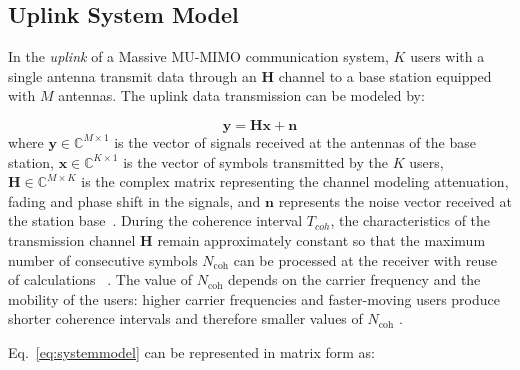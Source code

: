 \documentclass[12pt]{article}
\begin{document}
\subsection{Uplink System Model}
\label{sec:sysmodel}

In the \textit{uplink} of a Massive MU-MIMO communication system, $K$ users
with a single antenna transmit data through an $\mathbf{H}$ channel to
a base station equipped with $M$ antennas. The uplink data transmission
can be modeled by:

\begin{equation}
\mathbf{y} = \mathbf{H}\mathbf{x} + \mathbf{n}
\label{eq:systemmodel}
\end{equation}
where $\mathbf{y} \in \mathbb{C}^{M\times1}$ is the vector of signals received at the
antennas of the base station, $\mathbf{x} \in \mathbb{C}^{K\times1}$ is the vector of
symbols transmitted by the $K$ users, $\mathbf{H} \in \mathbb{C}^{M\times K}$
is the complex matrix representing the channel modeling attenuation, fading
and phase shift in the signals, and $\mathbf{n}$ represents the noise vector
received at the station base~\cite{rodriguezsanchez2020}. During the coherence interval $T_{coh}$, the characteristics of the
transmission channel $\mathbf{H}$ remain approximately constant so that the maximum number of
consecutive symbols $N_\text{coh}$ can be processed at the receiver with reuse
of calculations ~\cite{zhao2025jsac}. The value of $N_\text{coh}$ depends on the
carrier frequency and the mobility of the users: higher carrier frequencies
and faster-moving users produce shorter coherence intervals and therefore
smaller values of $N_\text{coh}$ \cite{coherence-time}.

Eq.~\eqref{eq:systemmodel} can be represented in matrix form as:
\end{document}
